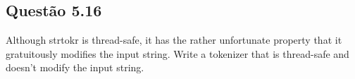 
\subsection{Questão 5.16}

Although strtokr is thread-safe, it has the rather unfortunate property that it gratuitously modifies the input string. Write a tokenizer that is thread-safe and doesn’t modify the input string.





